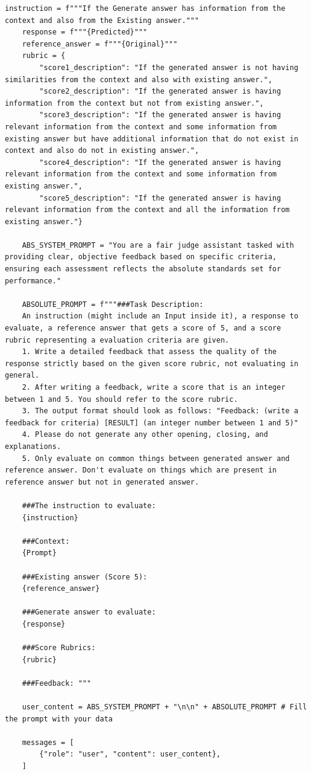 \begin{lstlisting}[style=python, frame = single, caption=Prompt estructured faithfullness, label=code:estructured-faithfullness]
    instruction = f"""If the Generate answer has information from the context and also from the Existing answer."""
    response = f"""{Predicted}"""
    reference_answer = f"""{Original}"""
    rubric = {
        "score1_description": "If the generated answer is not having similarities from the context and also with existing answer.",
        "score2_description": "If the generated answer is having information from the context but not from existing answer.",
        "score3_description": "If the generated answer is having relevant information from the context and some information from existing answer but have additional information that do not exist in context and also do not in existing answer.",
        "score4_description": "If the generated answer is having relevant information from the context and some information from existing answer.",
        "score5_description": "If the generated answer is having relevant information from the context and all the information from existing answer."}

    ABS_SYSTEM_PROMPT = "You are a fair judge assistant tasked with providing clear, objective feedback based on specific criteria, ensuring each assessment reflects the absolute standards set for performance."

    ABSOLUTE_PROMPT = f"""###Task Description:
    An instruction (might include an Input inside it), a response to evaluate, a reference answer that gets a score of 5, and a score rubric representing a evaluation criteria are given.
    1. Write a detailed feedback that assess the quality of the response strictly based on the given score rubric, not evaluating in general.
    2. After writing a feedback, write a score that is an integer between 1 and 5. You should refer to the score rubric.
    3. The output format should look as follows: "Feedback: (write a feedback for criteria) [RESULT] (an integer number between 1 and 5)"
    4. Please do not generate any other opening, closing, and explanations.
    5. Only evaluate on common things between generated answer and reference answer. Don't evaluate on things which are present in reference answer but not in generated answer.

    ###The instruction to evaluate:
    {instruction}

    ###Context:
    {Prompt}

    ###Existing answer (Score 5):
    {reference_answer}

    ###Generate answer to evaluate:
    {response}

    ###Score Rubrics:
    {rubric}

    ###Feedback: """

    user_content = ABS_SYSTEM_PROMPT + "\n\n" + ABSOLUTE_PROMPT # Fill the prompt with your data

    messages = [
        {"role": "user", "content": user_content},
    ]
\end{lstlisting}

